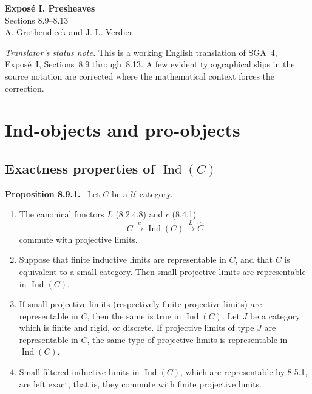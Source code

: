 \documentclass[11pt]{article}
\newcommand{\U}{\mathcal{U}}
\newcommand{\Ind}{\operatorname{Ind}}
\newenvironment{statement}[1]{\par\medskip\noindent\textbf{#1.}\ }{\par\medskip}
\begin{document}
\begin{center}
{\Large \textbf{Expos\'e I. Presheaves}}\\[0.35em]
{\large Sections 8.9--8.13}\\[0.35em]
A. Grothendieck and J.-L. Verdier
\end{center}

\bigskip

\noindent\emph{Translator's status note.} This is a working English translation of SGA~4, Expos\'e~I, Sections~8.9 through~8.13. A few evident typographical slips in the source notation are corrected where the mathematical context forces the correction.

\setcounter{section}{7}
\section{Ind-objects and pro-objects}

\setcounter{subsection}{8}
\subsection{Exactness properties of \texorpdfstring{$\Ind(C)$}{Ind(C)}}

\begin{statement}{Proposition 8.9.1}
Let $C$ be a $\U$-category.
\begin{enumerate}[label=\alph*)]
\item The canonical functors $L$ (8.2.4.8) and $c$ (8.4.1)
\[
 C\xrightarrow{c}\Ind(C)\xrightarrow{L}\widehat C
\]
commute with projective limits.

\item Suppose that finite inductive limits are representable in $C$, and that $C$ is equivalent to a small category. Then small projective limits are representable in $\Ind(C)$.

\item If small projective limits (respectively finite projective limits) are representable in $C$, then the same is true in $\Ind(C)$. Let $J$ be a category which is finite and rigid, or discrete. If projective limits of type $J$ are representable in $C$, the same type of projective limits is representable in $\Ind(C)$.

\item Small filtered inductive limits in $\Ind(C)$, which are representable by 8.5.1, are left exact, that is, they commute with finite projective limits.
\end{enumerate}
\end{statement}
\end{document}
